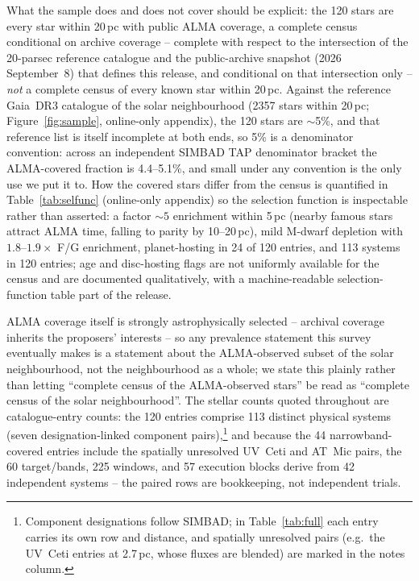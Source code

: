 \documentclass{openjournal}
\begin{document}
What the sample does and does not cover should be explicit: the 120
stars are every star within 20\,pc with public ALMA coverage, a
complete census conditional on archive coverage -- complete with
respect to the intersection of the 20-parsec reference catalogue and
the public-archive snapshot (2026 September~8) that defines this
release, and conditional on that intersection only -- \emph{not} a
complete census of every known star within 20\,pc. Against the
reference Gaia~DR3 catalogue of the solar neighbourhood (2357 stars
within 20\,pc; Figure~\ref{fig:sample}, online-only appendix), the
120 stars are
$\sim$5\%, and that reference list is itself incomplete at both ends,
so 5\% is a denominator convention: across an independent SIMBAD TAP
denominator bracket the ALMA-covered fraction is 4.4--5.1\%, and
small under any convention is the only use we put it to. How the
covered stars differ from the census is quantified in
Table~\ref{tab:selfunc} (online-only appendix) so the selection
function is inspectable rather than asserted: a factor ${\sim}5$ enrichment within 5\,pc
(nearby famous stars attract ALMA time, falling to parity by
10--20\,pc), mild M-dwarf depletion with $1.8$--$1.9\times$ F/G
enrichment, planet-hosting in 24 of 120 entries, and 113 systems in
120 entries; age and disc-hosting flags are not uniformly available
for the census and are documented qualitatively, with a
machine-readable selection-function table part of the release.

ALMA coverage itself is strongly astrophysically selected -- archival
coverage inherits the proposers' interests -- so any prevalence
statement this survey eventually makes is a statement about the
ALMA-observed subset of the solar neighbourhood, not the neighbourhood
as a whole; we state this plainly rather than letting ``complete
census of the ALMA-observed stars'' be read as ``complete census of
the solar neighbourhood''. The stellar counts quoted throughout are
catalogue-entry counts: the 120 entries comprise 113 distinct physical
systems (seven designation-linked component
pairs),\footnote{Component designations follow SIMBAD; in
Table~\ref{tab:full} each entry carries its own row and distance, and
spatially unresolved pairs (e.g.\ the UV~Ceti entries at 2.7\,pc,
whose fluxes are blended) are marked in the notes column.} and because
the 44 narrowband-covered entries include the spatially unresolved
UV~Ceti and AT~Mic pairs, the 60 target/bands, 225 windows, and 57
execution blocks derive from 42 independent systems -- the paired rows
are bookkeeping, not independent trials.
\end{document}
